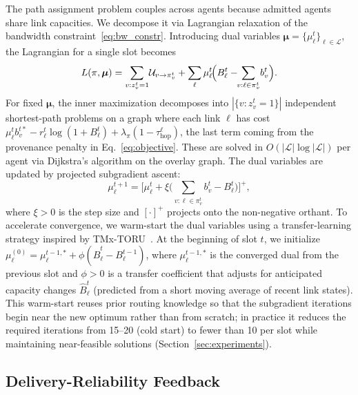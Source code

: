 \documentclass[final,3p,times,review,sort&compress]{elsarticle}
\begin{document}
The path assignment problem couples across agents because admitted agents share link capacities. We decompose it via Lagrangian relaxation of the bandwidth constraint~\eqref{eq:bw_constr}. Introducing dual variables $\boldsymbol{\mu} = \{\mu_\ell^t\}_{\ell\in\mathcal{L}}$, the Lagrangian for a single slot becomes
\begin{equation}
L(\pi,\boldsymbol{\mu}) = \sum_{v:z_v^t=1}\!\mathcal{U}_{v\to\pi_v^t} + \sum_{\ell}\mu_\ell^t\!\Bigl(B_\ell^t - \!\!\sum_{v:\ell\in\pi_v^t}\!b_v^t\Bigr).
\label{eq:lagrangian}
\end{equation}
For fixed $\boldsymbol{\mu}$, the inner maximization decomposes into $|\{v:z_v^t=1\}|$ independent shortest-path problems on a graph where each link $\ell$ has cost $\mu_\ell^t b_v^{t*} - r_\ell^t\log(1+B_\ell^t) + \lambda_\pi(1-\tau_{\mathrm{hop}}^\ell)$, the last term coming from the provenance penalty in Eq.~\eqref{eq:objective}. These are solved in $O(|\mathcal{L}|\log|\mathcal{L}|)$ per agent via Dijkstra’s algorithm on the overlay graph. The dual variables are updated by projected subgradient ascent:
\begin{equation}
\mu_\ell^{t+1} = \bigl[\mu_\ell^t + \xi\bigl(\textstyle\sum_{v:\ell\in\pi_v^t}b_v^t - B_\ell^t\bigr)\bigr]^+,
\label{eq:dual_update}
\end{equation}
where $\xi > 0$ is the step size and $[\cdot]^+$ projects onto the non-negative orthant. To accelerate convergence, we warm-start the dual variables using a transfer-learning strategy inspired by TMx-TORU~\cite{AKYILDIZ2026108292}. At the beginning of slot $t$, we initialize $\mu_\ell^{(0)} = \mu_\ell^{t-1,*} + \phi(\hat{B}_\ell^t - B_\ell^{t-1})$, where $\mu_\ell^{t-1,*}$ is the converged dual from the previous slot and $\phi > 0$ is a transfer coefficient that adjusts for anticipated capacity changes $\hat{B}_\ell^t$ (predicted from a short moving average of recent link states). This warm-start reuses prior routing knowledge so that the subgradient iterations begin near the new optimum rather than from scratch; in practice it reduces the required iterations from 15--20 (cold start) to fewer than 10 per slot while maintaining near-feasible solutions (Section~\ref{sec:experiments}).

\subsection{Delivery-Reliability Feedback}
\label{subsec:provenance}
\end{document}

